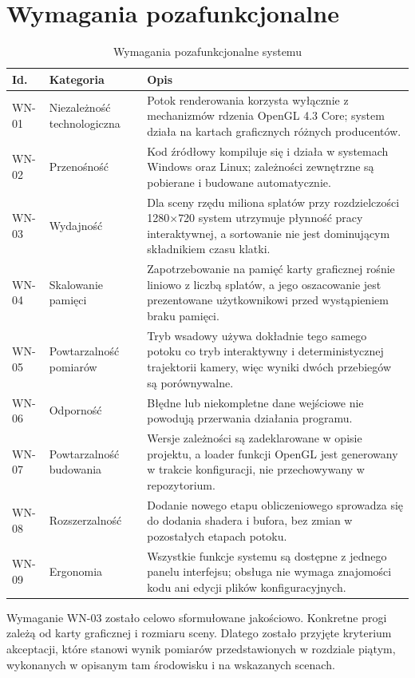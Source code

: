 \section{Wymagania pozafunkcjonalne}
\label{sec:pozafunkcjonalne}
\begin{table}[htbp]
  \centering
  \caption{Wymagania pozafunkcjonalne systemu}
  \label{tab:wn}
  \small
  \renewcommand{\arraystretch}{1.15}
  \begin{tabularx}{\textwidth}{
      >{\raggedright\arraybackslash}p{}
      >{\raggedright\arraybackslash}p{}
      >{\raggedright\arraybackslash}X}
    \toprule
    \textbf{Id.} & \textbf{Kategoria} & \textbf{Opis} \\
    \midrule
    WN-01 & Niezależność technologiczna & Potok renderowania korzysta
            wyłącznie z mechanizmów rdzenia OpenGL 4.3 Core; system działa
            na kartach graficznych różnych producentów. \\
    WN-02 & Przenośność & Kod źródłowy kompiluje się i działa w systemach
            Windows oraz Linux; zależności zewnętrzne są pobierane
            i budowane automatycznie. \\
    WN-03 & Wydajność & Dla sceny rzędu miliona splatów przy rozdzielczości
            1280$\times$720 system utrzymuje płynność pracy interaktywnej,
            a sortowanie nie jest dominującym składnikiem czasu klatki. \\
    WN-04 & Skalowanie pamięci & Zapotrzebowanie na pamięć karty graficznej
            rośnie liniowo z liczbą splatów, a jego oszacowanie jest
            prezentowane użytkownikowi przed wystąpieniem braku pamięci. \\
    WN-05 & Powtarzalność pomiarów & Tryb wsadowy używa dokładnie tego
            samego potoku co tryb interaktywny i deterministycznej
            trajektorii kamery, więc wyniki dwóch przebiegów są
            porównywalne. \\
    WN-06 & Odporność & Błędne lub niekompletne dane wejściowe nie powodują
            przerwania działania programu. \\
    WN-07 & Powtarzalność budowania & Wersje zależności są zadeklarowane
            w opisie projektu, a loader funkcji OpenGL jest generowany
            w trakcie konfiguracji, nie przechowywany w repozytorium. \\
    WN-08 & Rozszerzalność & Dodanie nowego etapu obliczeniowego sprowadza
            się do dodania shadera i bufora, bez zmian w pozostałych
            etapach potoku. \\
    WN-09 & Ergonomia & Wszystkie funkcje systemu są dostępne z jednego
            panelu interfejsu; obsługa nie wymaga znajomości kodu ani
            edycji plików konfiguracyjnych. \\
    \bottomrule
  \end{tabularx}
\end{table}
Wymaganie WN-03 zostało celowo sformułowane jakościowo. Konkretne progi zależą od karty graficznej i rozmiaru sceny. Dlatego zostało przyjęte kryterium akceptacji, które stanowi wynik pomiarów przedstawionych w rozdziale piątym, wykonanych w opisanym tam środowisku i na wskazanych scenach.

